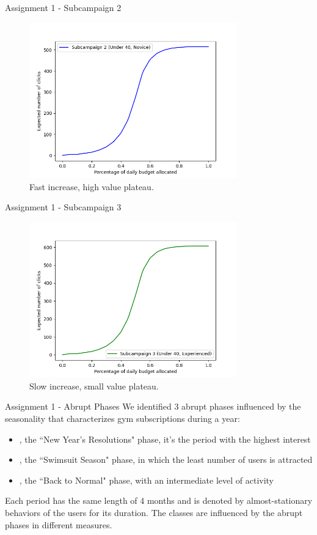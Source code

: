 \documentclass[11pt]{beamer}
\begin{document}
\begin{frame}{Assignment 1 - Subcampaign 2}
\begin{figure}[hbtp]
\centering
\includegraphics[width=0.8\textwidth]{images/subcampaign_2.png}
\caption{Fast increase, high value plateau.}
\end{figure}
\end{frame}

\begin{frame}{Assignment 1 - Subcampaign 3}
\begin{figure}[hbtp]
\centering
\includegraphics[width=0.8\textwidth]{images/subcampaign_3.png}
\caption{Slow increase, small value plateau.}
\end{figure}
\end{frame}

\begin{frame}{Assignment 1 - Abrupt Phases}
We identified 3 abrupt phases influenced by the seasonality that characterizes gym subscriptions during a year:
\begin{itemize}
\item [1.] [January-April], the ``New Year's Resolutions" phase, it's the period with the highest interest
\item [2.] [May-August], the ``Swimsuit Season" phase, in which the least number of users is attracted
\item [3.] [September-December], the ``Back to Normal" phase, with an intermediate level of activity 
\end{itemize}
Each period has the same length of 4 months and is denoted by almost-stationary behaviors of the users for its duration. The classes are influenced by the abrupt phases in different measures.
\end{frame} 
\end{document}
